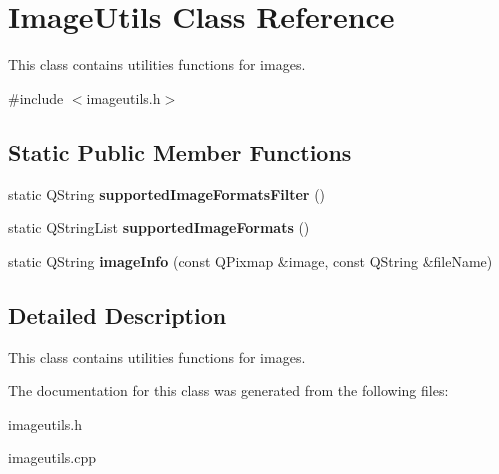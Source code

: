 \hypertarget{class_image_utils}{
\section{ImageUtils Class Reference}
\label{class_image_utils}
}


This class contains utilities functions for images.  




{\ttfamily \#include $<$imageutils.h$>$}

\subsection*{Static Public Member Functions}
\begin{DoxyCompactItemize}
\item 
\hypertarget{class_image_utils_ae6b2cb88b31f3428d9aea305bb61e896}{
static QString {\bfseries supportedImageFormatsFilter} ()}
\label{class_image_utils_ae6b2cb88b31f3428d9aea305bb61e896}

\item 
\hypertarget{class_image_utils_ace0012f003d3dc27294d139c1672390f}{
static QStringList {\bfseries supportedImageFormats} ()}
\label{class_image_utils_ace0012f003d3dc27294d139c1672390f}

\item 
\hypertarget{class_image_utils_a6455f4a9aad0087fdeb68d1b1fdb5905}{
static QString {\bfseries imageInfo} (const QPixmap \&image, const QString \&fileName)}
\label{class_image_utils_a6455f4a9aad0087fdeb68d1b1fdb5905}

\end{DoxyCompactItemize}


\subsection{Detailed Description}
This class contains utilities functions for images. 

The documentation for this class was generated from the following files:\begin{DoxyCompactItemize}
\item 
imageutils.h\item 
imageutils.cpp\end{DoxyCompactItemize}
